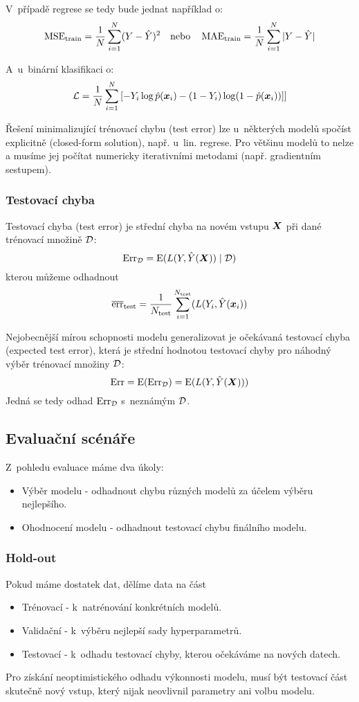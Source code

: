 V~případě regrese se tedy bude jednat například o:
\[
    \operatorname{MSE}_{\text{train}} = \frac{1}{N} \sum_{i=1}^{N} (Y - \hat{Y})^2
    \quad \text{nebo} \quad
    \operatorname{MAE}_{\text{train}} = \frac{1}{N} \sum_{i=1}^{N} |Y - \hat{Y}|
\]

A~u~binární klasifikaci o:
\[
    \mathcal{L} = \frac{1}{N} \sum_{i=1}^{N}
    \left[
        - Y_i\log\hat{p}(\bm{x}_i) - (1-Y_i)\log(1-\hat{p}(\bm{x}_i))]
    \right]
\]

Řešení minimalizující trénovací chybu (test error) lze u~některých modelů spočíst explicitně (closed-form solution), např. u~lin. regrese. Pro většinu modelů to nelze a musíme jej počítat numericky iterativními metodami (např. gradientním sestupem).

\subsubsection{Testovací chyba}

Testovací chyba (test error) je střední chyba na novém vstupu $\bm{X}$ při dané trénovací množině $\mathcal{D}$:
\[
    \text{Err}_{\mathcal{D}} = \operatorname{E} (L(Y, \hat{Y}(\bm{X})) \mid \mathcal{D})
\]
kterou můžeme odhadnout
\[
    \overline{\text{err}}_{\text{test}} = \frac{1}{N_{\text{test}}} \sum_{i=1}^{N_{\text{test}}} (L(Y_i, \hat{Y}(\bm{x}_i))
\]

Nejobecnější mírou schopnosti modelu generalizovat je očekávaná testovací chyba (expected test error), která je střední hodnotou testovací chyby pro náhodný výběr trénovací množiny $\mathcal{D}$:
\[
    \text{Err} = \operatorname{E} (\text{Err}_{\mathcal{D}}) = \operatorname{E} (L(Y, \hat{Y}(\bm{X})))
\]
Jedná se tedy odhad $\text{Err}_{\mathcal{D}}$ s~neznámým $\mathcal{D}$.

\subsection{Evaluační scénáře}

Z~pohledu evaluace máme dva úkoly:
\begin{itemize}
    \item Výběr modelu - odhadnout chybu různých modelů za účelem výběru nejlepšího.
    \item Ohodnocení modelu - odhadnout testovací chybu finálního modelu.
\end{itemize}

\subsubsection{Hold-out}

Pokud máme dostatek dat, dělíme data na část
\begin{itemize}
    \item Trénovací - k~natrénování konkrétních modelů.
    \item Validační - k~výběru nejlepší sady hyperparametrů.
    \item Testovací - k~odhadu testovací chyby, kterou očekáváme na nových datech.
\end{itemize}
Pro získání neoptimistického odhadu výkonnosti modelu, musí být testovací část skutečně nový vstup, který nijak neovlivnil parametry ani volbu modelu.

